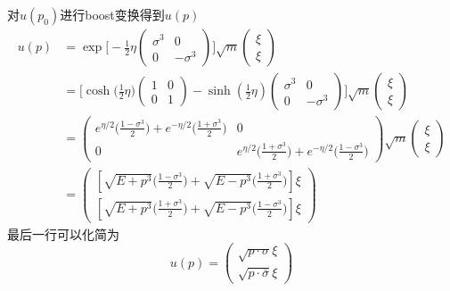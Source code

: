 \begin{exercise}{对$u(p_0)$进行boost变换得到$u(p)$}
\begin{align}\nonumber
u(p) & = \exp \bigg[ - \frac{1}{2} \eta \begin{pmatrix}
\sigma^3 & 0 \\ 
0 & - \sigma^3
\end{pmatrix} \bigg] \sqrt{m} \begin{pmatrix}
\xi \\ \xi
\end{pmatrix} \\ \nonumber
& = \bigg[ \cosh\big(\frac{1}{2}\eta\big)\begin{pmatrix}
1 & 0 \\
0 & 1
\end{pmatrix} - \sinh (\frac{1}{2}\eta) \begin{pmatrix}
\sigma^3 & 0 \\ \nonumber
0 & - \sigma^3
\end{pmatrix} \bigg]\sqrt{m} \begin{pmatrix}
\xi \\ \xi
\end{pmatrix} \\ \nonumber
& = \begin{pmatrix}
e^{\eta/2}\bigg(\frac{1-\sigma^3}{2}\bigg)+e^{-\eta/2}\bigg(\frac{1+\sigma^3}{2}\bigg) & 0\\
0 & e^{\eta/2}\bigg(\frac{1+\sigma^3}{2}\bigg)+e^{-\eta/2}\bigg(\frac{1-\sigma^3}{2}\bigg)
\end{pmatrix}\sqrt{m}\begin{pmatrix}
\xi \\ 
\xi
\end{pmatrix} \\\nonumber
& = \begin{pmatrix}
[\sqrt{E+p^3}\bigg(\frac{1-\sigma^3}{2}\bigg)+\sqrt{E-p^3}\bigg(\frac{1+\sigma^3}{2}\bigg)]\xi \\
[\sqrt{E+p^3}\bigg(\frac{1+\sigma^3}{2}\bigg)+\sqrt{E-p^3}\bigg(\frac{1-\sigma^3}{2}\bigg)]\xi
\end{pmatrix}
\end{align}
最后一行可以化简为
\begin{equation}
u(p) = \begin{pmatrix}
\sqrt{p\cdot\sigma}\xi \\
\sqrt{p\cdot\bar\sigma}\xi
\end{pmatrix}
\end{equation}
\end{exercise}

